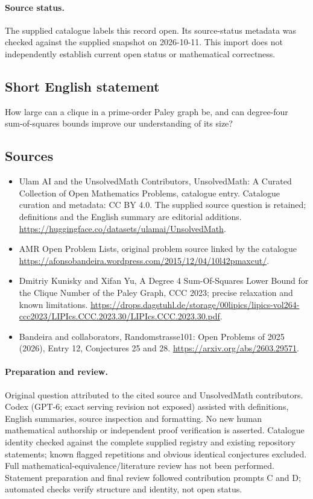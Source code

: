 \documentclass[11pt]{article}
\begin{document}
\paragraph{Source status.}
The supplied catalogue labels this record open. Its source-status metadata was checked against the supplied snapshot on 2026-10-11. This import does not independently establish current open status or mathematical correctness.
\subsection{Short English statement}
How large can a clique in a prime-order Paley graph be, and can degree-four sum-of-squares bounds improve our understanding of its size?
\subsection{Sources}
\begin{itemize}
\item[\hypertarget{source:statement:1}{S1}] Ulam AI and the UnsolvedMath Contributors, UnsolvedMath: A Curated Collection of Open Mathematics Problems, catalogue entry. Catalogue curation and metadata: CC BY 4.0. The supplied source question is retained; definitions and the English summary are editorial additions.
\url{https://huggingface.co/datasets/ulamai/UnsolvedMath}.
\item[\hypertarget{source:statement:2}{S2}] AMR Open Problem Lists, original problem source linked by the catalogue
\url{https://afonsobandeira.wordpress.com/2015/12/04/10l42pmaxcut/}.
\item[\hypertarget{source:statement:3}{S3}] Dmitriy Kunisky and Xifan Yu, A Degree 4 Sum-Of-Squares Lower Bound for the Clique Number of the Paley Graph, CCC 2023; precise relaxation and known limitations.
\url{https://drops.dagstuhl.de/storage/00lipics/lipics-vol264-ccc2023/LIPIcs.CCC.2023.30/LIPIcs.CCC.2023.30.pdf}.
\item[\hypertarget{source:statement:4}{S4}] Bandeira and collaborators, Randomstrasse101: Open Problems of 2025 (2026), Entry 12, Conjectures 25 and 28.
\url{https://arxiv.org/abs/2603.29571}.
\end{itemize}
\paragraph{Preparation and review.}
Original question attributed to the cited source and UnsolvedMath contributors. Codex (GPT-6; exact serving revision not exposed) assisted with definitions, English summaries, source inspection and formatting. No new human mathematical authorship or independent proof verification is asserted. Catalogue identity checked against the complete supplied registry and existing repository statements; known flagged repetitions and obvious identical conjectures excluded. Full mathematical-equivalence/literature review has not been performed. Statement preparation and final review followed contribution prompts C and D; automated checks verify structure and identity, not open status.
\label{end:statement}
\end{document}
